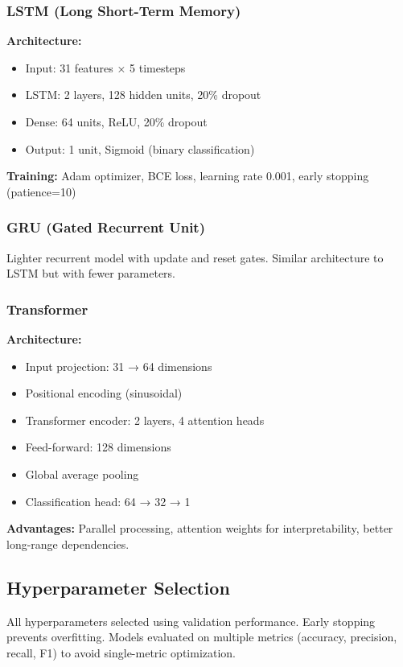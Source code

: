 \documentclass[10pt,twocolumn]{article}
\begin{document}
\subsubsection{LSTM (Long Short-Term Memory)}

\textbf{Architecture:}
\begin{itemize}
\item Input: 31 features × 5 timesteps
\item LSTM: 2 layers, 128 hidden units, 20\% dropout
\item Dense: 64 units, ReLU, 20\% dropout
\item Output: 1 unit, Sigmoid (binary classification)
\end{itemize}

\textbf{Training:} Adam optimizer, BCE loss, learning rate 0.001, early stopping (patience=10)

\subsubsection{GRU (Gated Recurrent Unit)}

Lighter recurrent model with update and reset gates. Similar architecture to LSTM but with fewer parameters.

\subsubsection{Transformer}

\textbf{Architecture:}
\begin{itemize}
\item Input projection: 31 → 64 dimensions
\item Positional encoding (sinusoidal)
\item Transformer encoder: 2 layers, 4 attention heads
\item Feed-forward: 128 dimensions
\item Global average pooling
\item Classification head: 64 → 32 → 1
\end{itemize}

\textbf{Advantages:} Parallel processing, attention weights for interpretability, better long-range dependencies.

\subsection{Hyperparameter Selection}

All hyperparameters selected using validation performance. Early stopping prevents overfitting. Models evaluated on multiple metrics (accuracy, precision, recall, F1) to avoid single-metric optimization.
\end{document}
